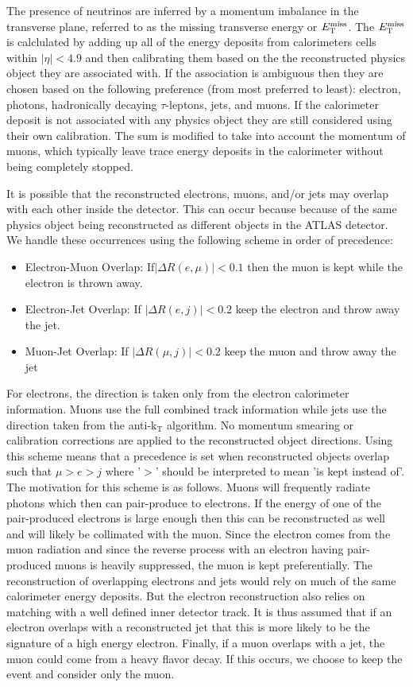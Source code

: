 The presence of neutrinos are inferred by a momentum
imbalance in the transverse plane, referred to as the missing
transverse energy or $E_{\mathrm{T}}^{\mathrm{miss}}$. The $E_{\mathrm{T}}^{\mathrm{miss}}$ is calclulated by 
adding up all of 
the energy deposits from calorimeters cells within $|\eta| < 4.9$
and then calibrating them based on the the reconstructed
physics object they are associated with.
If the association is ambiguous then they are chosen based on the following
preference (from most preferred to least): electron, photons, 
hadronically decaying $\tau$-leptons, jets, and muons.
If the calorimeter deposit is not associated with any physics object
they are still considered using their own calibration.
The sum is modified to take into account the momentum of muons,
which typically leave trace energy deposits
in the calorimeter without being completely stopped.



It is possible that the reconstructed electrons, muons, and/or jets
may overlap with each other inside the detector.  This can occur
because because of the same physics object being reconstructed as different
objects in the ATLAS detector.  We handle these occurrences using the following
scheme in order of precedence:
\begin{itemize}
	\item Electron-Muon Overlap: If$|\Delta R(e,\mu)| < 0.1$ then the  muon is kept while the electron is thrown away.
	\item Electron-Jet Overlap: If $|\Delta R(e,j)| < 0.2$ keep the electron and throw away the jet.
	\item Muon-Jet Overlap: If $|\Delta R(\mu,j)| < 0.2$ keep the muon and throw away the jet
\end{itemize}
For electrons, the direction is taken only from the electron calorimeter
information.  Muons use the full combined track information while jets
use the direction taken from the anti-k$_{\mathrm{T}}$  algorithm.
No momentum smearing or calibration corrections
are applied to the reconstructed object directions. 
Using this scheme means that a precedence is set when 
reconstructed objects overlap such that $\mu > e > j$ where '$>$' should
be interpreted to mean 'is kept instead of'. The motivation for this scheme
is as follows. Muons will frequently radiate photons which then can pair-produce
to electrons.  If the energy of one of the pair-produced electrons is 
large enough then this can be reconstructed as well and will likely be collimated
with the muon.  Since the electron comes from the muon radiation and
since the reverse process with an electron having pair-produced muons
is heavily suppressed, the muon is kept preferentially.  The reconstruction
of overlapping electrons and jets
would rely on much of the same calorimeter energy deposits.  But the electron
reconstruction also relies on matching with a well defined inner detector
track.  It is thus assumed that if an electron overlaps with a reconstructed
jet that this is more likely to be the signature of a high energy electron.
Finally, if a muon overlaps with a jet, the muon could come from a heavy flavor 
decay. If this occurs, we choose to keep the event and consider only the muon.


